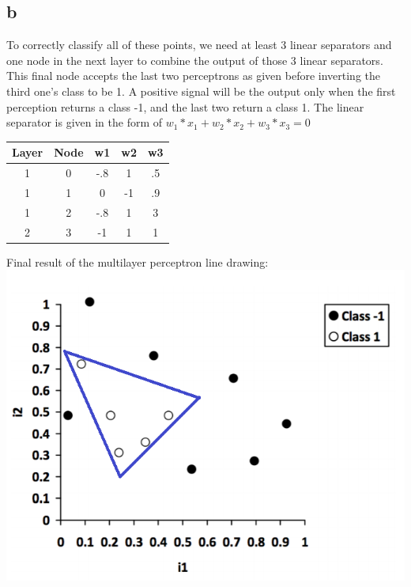 \documentclass[11pt, oneside]{article}   	%
\begin{document}
\begin{flushleft}
\subsection*{b}
To correctly classify all of these points, we need at least 3 linear separators and one node in the next layer to combine the output of those 3 linear separators. This final node accepts the last two perceptrons as given before inverting the third one's class to be 1. A positive signal will be the output only when the first perception returns a class -1, and the last two return a class 1.
The linear separator is given in the form of $w_{1}*x_{1}+w_{2}*x_{2}+w_{3}*x_{3}=0$
\begin{center}
\begin{tabular}{|c|c|c|c|c|}
\hline
Layer & Node & w1 &	w2 & w3 \\ \hline
1 & 0 & -.8 & 1 & .5 \\ \hline
1 & 1 & 0 & -1 & .9 \\ \hline
1 & 2 &	-.8 & 1 & 3 \\ \hline
2 & 3 &	-1 & 1 & 1 \\ \hline
\end{tabular}
\end{center}
Final result of the multilayer perceptron line drawing: \\
\includegraphics[]{q5_mlp.png}

\end{flushleft}
\end{document}
